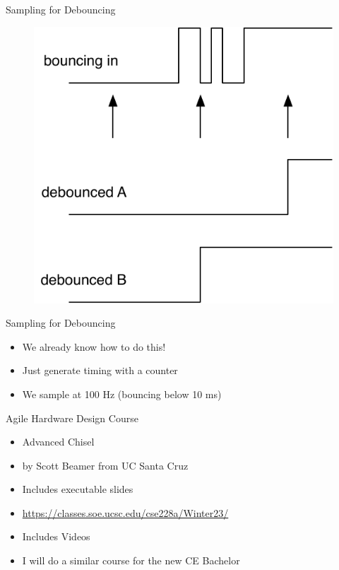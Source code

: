 \begin{frame}[fragile]{Sampling for Debouncing}
\begin{figure}
  \includegraphics[scale=\scale]{../figures/debounce}
\end{figure}
\end{frame}


\begin{frame}[fragile]{Sampling for Debouncing}
\begin{itemize}
\item We already know how to do this!
\item Just generate timing with a counter
\item We sample at 100 Hz (bouncing below 10 ms)
\end{itemize}
\end{frame}



\begin{frame}[fragile]{Agile Hardware Design Course}
\begin{itemize}
\item Advanced Chisel
\item by Scott Beamer from UC Santa Cruz
\item Includes executable slides
\item \url{https://classes.soe.ucsc.edu/cse228a/Winter23/}
\item Includes Videos
\item I will do a similar course for the new CE Bachelor
\end{itemize}
\end{frame}

